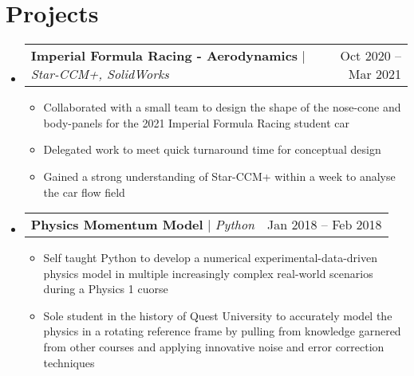 \documentclass[a4paper,11pt]{article}
\makeatletter
\newcommand{\resumeItem}[1]{
  \item\small{
    {#1\vspace{-2pt}}
  }
}
\newcommand{\resumeProjectHeading}[2]{
    \item
    \begin{tabular*}{0.97\textwidth}{l@{\extracolsep{\fill}}r}
      \small#1 & #2 \\
    \end{tabular*}\vspace{-7pt}
}
\newcommand{\resumeSubHeadingListStart}{\begin{itemize}[leftmargin=0.15in, label={}]}
\newcommand{\resumeSubHeadingListEnd}{\end{itemize}}
\newcommand{\resumeItemListStart}{\begin{itemize}}
\newcommand{\resumeItemListEnd}{\end{itemize}\vspace{-5pt}}
\makeatother
\begin{document}
\section{Projects}
    \resumeSubHeadingListStart
    	\resumeProjectHeading
		    {\textbf{Imperial Formula Racing - Aerodynamics} $|$ \emph{Star-CCM+, SolidWorks}}{Oct 2020 -- Mar 2021}
		    \resumeItemListStart
		    \resumeItem{Collaborated with a small team to design the shape of the nose-cone and body-panels for the 2021 Imperial Formula Racing student car}
		    \resumeItem{Delegated work to meet quick turnaround time for conceptual design}
		    \resumeItem{Gained a strong understanding of Star-CCM+ within a week to analyse the car flow field}
    	\resumeItemListEnd
      \resumeProjectHeading
          {\textbf{Physics Momentum Model} $|$ \emph{Python}}{Jan 2018 -- Feb 2018}
          \resumeItemListStart
            \resumeItem{Self taught Python to develop a numerical experimental-data-driven physics model in multiple increasingly complex real-world scenarios during a Physics 1 cuorse}
            \resumeItem{Sole student in the history of Quest University to accurately model the physics in a rotating reference frame by pulling from knowledge garnered from other courses and applying innovative noise and error correction techniques}
          \resumeItemListEnd
    \resumeSubHeadingListEnd
%
\end{document}
